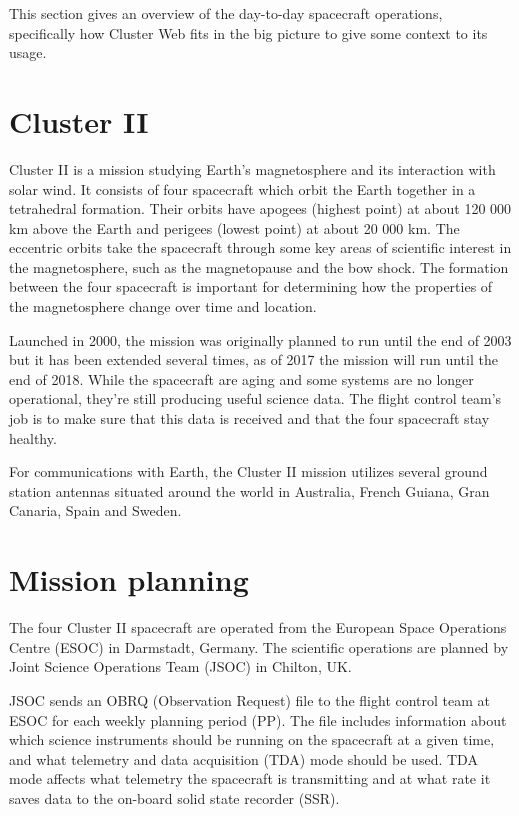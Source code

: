 
This section gives an overview of the day-to-day spacecraft operations, specifically how Cluster Web fits in the big picture to give some context to its usage.

\section{Cluster II}
Cluster II is a mission studying Earth's magnetosphere and its interaction with solar wind. It consists of four spacecraft which orbit the Earth together in a tetrahedral formation. Their orbits have apogees (highest point) at about 120 000 km above the Earth and perigees (lowest point) at about 20 000 km. The eccentric orbits take the spacecraft through some key areas of scientific interest in the magnetosphere, such as the magnetopause and the bow shock. The formation between the four spacecraft is important for determining how the properties of the magnetosphere change over time and location.

Launched in 2000, the mission was originally planned to run until the end of 2003 but it has been extended several times, as of 2017 the mission will run until the end of 2018. While the spacecraft are aging and some systems are no longer operational, they're still producing useful science data. The flight control team's job is to make sure that this data is received and that the four spacecraft stay healthy.

For communications with Earth, the Cluster II mission utilizes several ground station antennas situated around the world in Australia, French Guiana, Gran Canaria, Spain and Sweden.

\cite{escoubet2001introduction, esasci, esacluster}

\section{Mission planning}

The four Cluster II spacecraft are operated from the European Space Operations Centre (ESOC) in Darmstadt, Germany. The scientific operations are planned by Joint Science Operations Team (JSOC) in Chilton, UK.

JSOC sends an OBRQ (Observation Request) file to the flight control team at ESOC for each weekly planning period (PP). The file includes information about which science instruments should be running on the spacecraft at a given time, and what telemetry and data acquisition (TDA) mode should be used. TDA mode affects what telemetry the spacecraft is transmitting and at what rate it saves data to the on-board solid state recorder (SSR).

